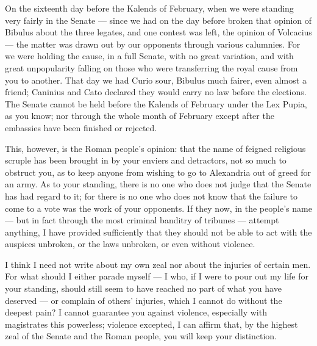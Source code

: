 

 On the sixteenth day before the Kalends of February, when we were standing very fairly in the Senate --- since we had on the day before broken that opinion of Bibulus about the three legates, and one contest was left, the opinion of Volcacius --- the matter was drawn out by our opponents through various calumnies. For we were holding the cause, in a full Senate, with no great variation, and with great unpopularity falling on those who were transferring the royal cause from you to another. That day we had Curio sour, Bibulus much fairer, even almost a friend; Caninius and Cato declared they would carry no law before the elections. The Senate cannot be held before the Kalends of February under the Lex Pupia, as you know; nor through the whole month of February except after the embassies have been finished or rejected.

 This, however, is the Roman people's opinion: that the name of feigned religious scruple has been brought in by your enviers and detractors, not so much to obstruct you, as to keep anyone from wishing to go to Alexandria out of greed for an army. As to your standing, there is no one who does not judge that the Senate has had regard to it; for there is no one who does not know that the failure to come to a vote was the work of your opponents. If they now, in the people's name --- but in fact through the most criminal banditry of tribunes --- attempt anything, I have provided sufficiently that they should not be able to act with the auspices unbroken, or the laws unbroken, or even without violence.

 I think I need not write about my own zeal nor about the injuries of certain men. For what should I either parade myself --- I who, if I were to pour out my life for your standing, should still seem to have reached no part of what you have deserved --- or complain of others' injuries, which I cannot do without the deepest pain? I cannot guarantee you against violence, especially with magistrates this powerless; violence excepted, I can affirm that, by the highest zeal of the Senate and the Roman people, you will keep your distinction.
